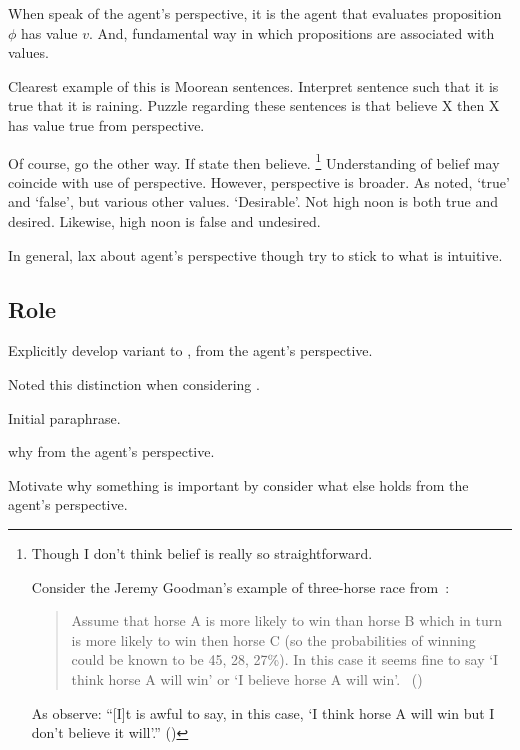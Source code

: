 \begin{note}
  When speak of the agent's perspective, it is the agent that evaluates proposition \(\phi\) has value \(v\).
  And, fundamental way in which propositions are associated with values.

  Clearest example of this is Moorean sentences.
  Interpret sentence such that it is true that it is raining.
  Puzzle regarding these sentences is that believe X then X has value true from perspective.

  Of course, go the other way.
  If state then believe.%
  \footnote{
    \label{fn:belief-is-difficult}
    Though I don't think belief is really so straightforward.

    Consider the Jeremy Goodman's example of three-horse race from~\textcite{Hawthorne:2016wv}:
    \begin{quote}
      Assume that horse A is more likely to win than horse B which in turn is more likely to win then horse C (so the probabilities of winning could be known to be 45, 28, 27\%).
      In this case it seems ﬁne to say `I think horse A will win' or `I believe horse A will win'.%
      \mbox{ }\hfill\mbox{(\citeyear[1440]{Hawthorne:2016wv})}
    \end{quote}
    As \citeauthor{Hawthorne:2016wv} observe: ``[I]t is awful to say, in this case, `I think horse A will win but I don't believe it will'.''
    (\citeyear[1440, fn.17]{Hawthorne:2016wv})
  }
  Understanding of belief may coincide with use of perspective.
  However, perspective is broader.
  As noted, `true' and `false', but various other values.
  `Desirable'.
  Not high noon is both true and desired.
  Likewise, high noon is false and undesired.
\end{note}

\begin{note}
  In general, lax about agent's perspective though try to stick to what is intuitive.
\end{note}


\subsection{Role}
\label{sec:role}

\begin{note}
  Explicitly develop variant to \qWhy{}, from the agent's perspective.

  Noted this distinction when considering \citeauthor{Davidson:1963aa}.

  Initial paraphrase.

  why from the agent's perspective.

  Motivate why something is important by consider what else holds from the agent's perspective.
\end{note}

